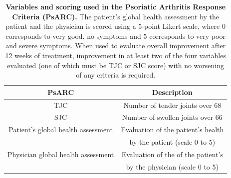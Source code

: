 \begin{table}[htbp]
\setlength{\tabcolsep}{20pt}
\renewcommand{\arraystretch}{1.5}
\begin{tabular}{@{} c c}
\toprule
\textbf{PsARC} & \textbf{Description} \\
\midrule
\midrule
TJC  & Number of tender joints over 68\\
SJC  & Number of swollen joints over 66 \\
Patient’s global health assessment  & Evaluation of the patient's health\\
                                    & by the patient (scale 0 to 5)\\
Physician global health assessment  & Evaluation of the of the patient's \\
                                    & by the physician (scale 0 to 5) \\
\bottomrule
\end{tabular}
\medskip %
\caption[Variables and scoring used in the Psoriatic Arthritis Response Criteria (PsARC)]{\textbf{Variables and scoring used in the Psoriatic Arthritis Response Criteria (PsARC).} The patient's global health assessment by the patient and the physician is scored using a 5-point Likert scale, where 0 corresponds to very good, no symptoms and 5 corresponds to very poor and severe symptoms. When used to evaluate overall improvement after 12 weeks of treatment, improvement in at least two of the four variables evaluated (one of which must be TJC or SJC score) with no worsening of any criteria is required.}
\label{tab:PsARC}
\end{table}
\bigskip %



